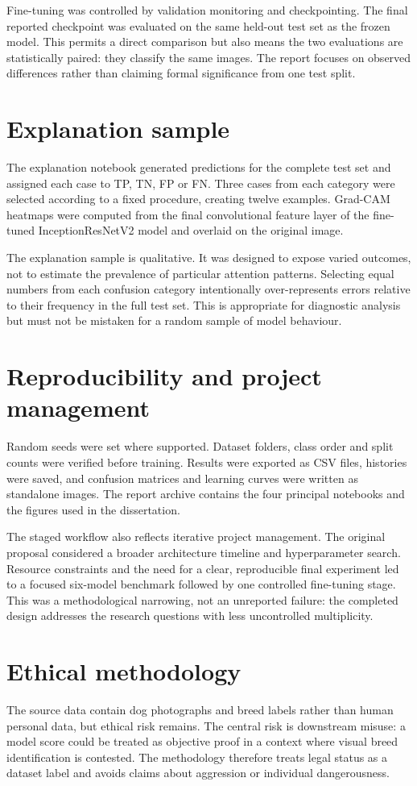 Fine-tuning was controlled by validation monitoring and checkpointing. The final reported checkpoint was evaluated on the same held-out test set as the frozen model. This permits a direct comparison but also means the two evaluations are statistically paired: they classify the same images. The report focuses on observed differences rather than claiming formal significance from one test split.

\section{Explanation sample}
The explanation notebook generated predictions for the complete test set and assigned each case to TP, TN, FP or FN. Three cases from each category were selected according to a fixed procedure, creating twelve examples. Grad-CAM heatmaps were computed from the final convolutional feature layer of the fine-tuned InceptionResNetV2 model and overlaid on the original image.

The explanation sample is qualitative. It was designed to expose varied outcomes, not to estimate the prevalence of particular attention patterns. Selecting equal numbers from each confusion category intentionally over-represents errors relative to their frequency in the full test set. This is appropriate for diagnostic analysis but must not be mistaken for a random sample of model behaviour.

\section{Reproducibility and project management}
Random seeds were set where supported. Dataset folders, class order and split counts were verified before training. Results were exported as CSV files, histories were saved, and confusion matrices and learning curves were written as standalone images. The report archive contains the four principal notebooks and the figures used in the dissertation.

The staged workflow also reflects iterative project management. The original proposal considered a broader architecture timeline and hyperparameter search. Resource constraints and the need for a clear, reproducible final experiment led to a focused six-model benchmark followed by one controlled fine-tuning stage. This was a methodological narrowing, not an unreported failure: the completed design addresses the research questions with less uncontrolled multiplicity.

\section{Ethical methodology}
The source data contain dog photographs and breed labels rather than human personal data, but ethical risk remains. The central risk is downstream misuse: a model score could be treated as objective proof in a context where visual breed identification is contested. The methodology therefore treats legal status as a dataset label and avoids claims about aggression or individual dangerousness.

